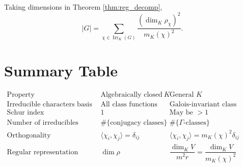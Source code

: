 \begin{cor}
Taking dimensions in Theorem \ref{thm:reg_decomp},
\[
|G| = \sum_{\chi \in \operatorname{Irr}_K(G)}
\frac{(\dim_K \rho_\chi)^2}{m_K(\chi)^2}.
\]
\end{cor}

\section{Summary Table}

\[
\boxed{
\begin{array}{c|c|c}
\text{Property} & \text{Algebraically closed } K & \text{General } K \\
\hline
\text{Irreducible characters basis} & \text{All class functions} & \text{Galois-invariant class functions} \\
\text{Schur index} & 1 & \text{May be } > 1 \\
\text{Number of irreducibles} & \#\{\text{conjugacy classes}\} & \#\{\Gamma\text{-classes}\}\\
\text{Orthogonality} & \langle \chi_i, \chi_j \rangle = \delta_{ij} & \langle \chi_i, \chi_j \rangle =  m_K(\chi)^2\delta_{ij} \\
\text{Regular representation multiplicity} & \dim \rho & \dfrac{\dim_K V}{m^2 r} = \dfrac{ \dim_K V}{m_K(\chi)^2} 
\end{array}
}
\]
